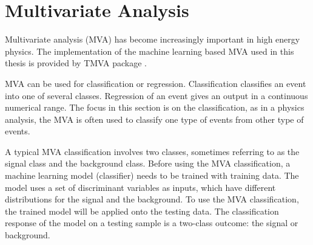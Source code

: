 \section{Multivariate Analysis}
\label{sec:pandoraMVA}

Multivariate analysis (MVA) has become increasingly important in high energy physics. The implementation of the machine learning based MVA used in this thesis is provided by  TMVA package \cite{Hocker:2007ht}.


MVA can be used for classification or regression. Classification classifies an event into one of several classes. Regression of an event  gives an output in a continuous numerical range. The focus in this section is on the classification, as in a physics analysis, the MVA is often used to classify one type of events from other type of events.

A typical MVA classification involves two classes, sometimes referring to as the signal class and the background class. Before using the MVA classification, a machine learning model (classifier) needs to be trained with training data. The model uses a set of discriminant variables as inputs, which have different distributions for the signal and the background. To use the MVA classification, the trained model will be applied onto the testing data. The classification response of the model on a testing sample is a two-class outcome:  the signal or background.

